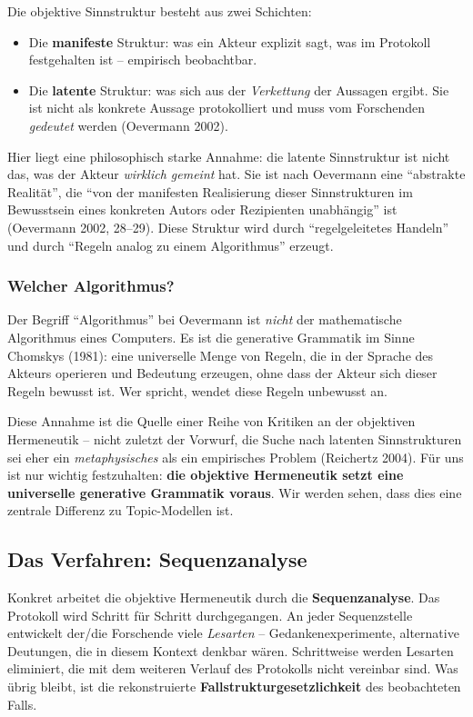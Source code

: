 \documentclass[a4paper,11pt]{article}
\begin{document}
Die objektive Sinnstruktur besteht aus zwei Schichten:

\begin{itemize}
\item Die \textbf{manifeste} Struktur: was ein Akteur explizit sagt,
was im Protokoll festgehalten ist -- empirisch beobachtbar.

\item Die \textbf{latente} Struktur: was sich aus der \emph{Verkettung}
der Aussagen ergibt. Sie ist nicht als konkrete Aussage protokolliert
und muss vom Forschenden \emph{gedeutet} werden (Oevermann 2002).
\end{itemize}

Hier liegt eine philosophisch starke Annahme: die latente Sinnstruktur
ist nicht das, was der Akteur \emph{wirklich gemeint} hat. Sie ist
nach Oevermann eine \enquote{abstrakte Realität}, die \enquote{von der
manifesten Realisierung dieser Sinnstrukturen im Bewusstsein eines
konkreten Autors oder Rezipienten unabhängig} ist (Oevermann 2002,
28--29). Diese Struktur wird durch \enquote{regelgeleitetes Handeln}
und durch \enquote{Regeln analog zu einem Algorithmus} erzeugt.

\subsubsection{Welcher Algorithmus?}

Der Begriff \enquote{Algorithmus} bei Oevermann ist \emph{nicht}
der mathematische Algorithmus eines Computers. Es ist die
generative Grammatik im Sinne Chomskys (1981): eine universelle
Menge von Regeln, die in der Sprache des Akteurs operieren und
Bedeutung erzeugen, ohne dass der Akteur sich dieser Regeln bewusst
ist. Wer spricht, wendet diese Regeln unbewusst an.

Diese Annahme ist die Quelle einer Reihe von Kritiken an der objektiven
Hermeneutik -- nicht zuletzt der Vorwurf, die Suche nach latenten
Sinnstrukturen sei eher ein \emph{metaphysisches} als ein empirisches
Problem (Reichertz 2004). Für uns ist nur wichtig festzuhalten:
\textbf{die objektive Hermeneutik setzt eine universelle generative
Grammatik voraus}. Wir werden sehen, dass dies eine zentrale Differenz
zu Topic-Modellen ist.

\subsection{Das Verfahren: Sequenzanalyse}

Konkret arbeitet die objektive Hermeneutik durch die
\textbf{Sequenzanalyse}. Das Protokoll wird Schritt für Schritt
durchgegangen. An jeder Sequenzstelle entwickelt der/die Forschende
viele \emph{Lesarten} -- Gedankenexperimente, alternative Deutungen,
die in diesem Kontext denkbar wären. Schrittweise werden Lesarten
eliminiert, die mit dem weiteren Verlauf des Protokolls nicht
vereinbar sind. Was übrig bleibt, ist die rekonstruierte
\textbf{Fallstrukturgesetzlichkeit} des beobachteten Falls.
\end{document}
